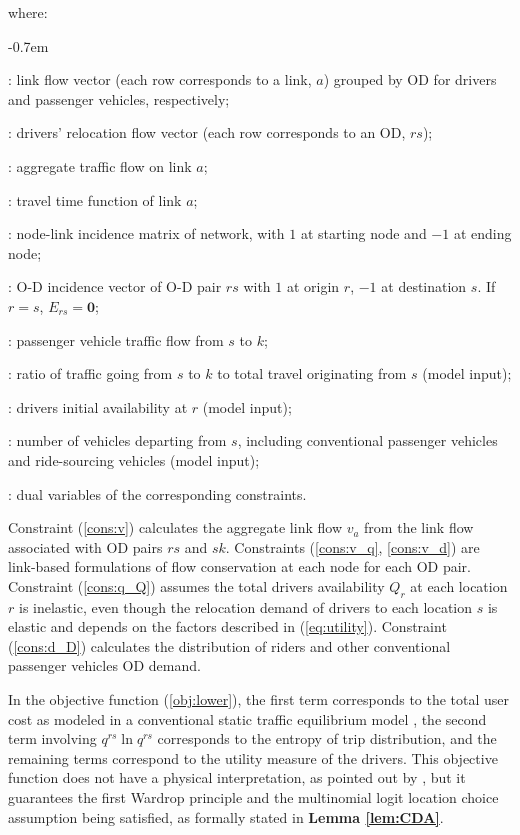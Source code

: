 \documentclass[review]{elsarticle}
\begin{document}
where: 
\begin{description}[leftmargin=!,labelwidth=\widthof{12345}]
\itemsep-0.7em
\item[$\bm{\hat{v}}_{rs}, \bm{\check{v}}_{sk}$] : link flow vector (each row corresponds to a link, $a$) grouped by OD for drivers and passenger vehicles, respectively;
\item[$\bm{q}$] : drivers' relocation flow vector (each row corresponds to an OD, $rs$);
\item[$v_a$] : aggregate traffic flow on link $a$; 
\item[$t_a(\cdot)$] : travel time function of link $a$; 
\item[$A$] : node-link incidence matrix of network, with $1$ at starting node and $-1$ at ending node;
\item[$E_{rs}$] : O-D incidence vector of O-D pair $rs$ with $1$ at origin $r$, $-1$ at destination $s$. If $r=s$, $E_{rs} = \bm{0}$;
\item[$\bar{d}_{sk}$] : passenger vehicle traffic flow from $s$ to $k$;
\item[$\delta_{sk}$] : ratio of traffic going from $s$ to $k$ to total travel originating from $s$ (model input); 
\item[$Q_{r}$] : drivers initial availability at $r$ (model input); 
\item[$\bar{D}_{s}$] : number of vehicles departing from $s$, including conventional passenger vehicles and ride-sourcing vehicles (model input); 
\item[$\check{\lambda}, \hat{\lambda}, \gamma, \eta$] : dual variables of the corresponding constraints. 
\end{description}

Constraint (\ref{cons:v}) calculates the aggregate link flow $v_a$ from the link flow associated with OD pairs $rs$ and $sk$. Constraints (\ref{cons:v_q}, \ref{cons:v_d}) are link-based formulations of flow conservation at each node for each OD pair. Constraint (\ref{cons:q_Q}) assumes the total drivers availability $Q_r$ at each location $r$ is inelastic, even though the relocation demand of drivers to each location $s$ is elastic and depends on the factors described in (\ref{eq:utility}). Constraint (\ref{cons:d_D}) calculates the distribution of riders and other conventional passenger vehicles OD demand.

In the objective function (\ref{obj:lower}), the first term corresponds to the total user cost as modeled in a conventional static traffic equilibrium model \citep{beckmann1956studies}, the second term involving $q^{rs}\ln q^{rs}$ corresponds to the entropy of trip distribution, and the remaining terms correspond to the utility measure of the drivers.  This objective function does not have a physical interpretation, as pointed out by \cite{Sheffi_85}, but it guarantees the first Wardrop principle \citep{Wardrop_52} and the multinomial logit location choice assumption being satisfied, as formally stated in {\bf Lemma \ref{lem:CDA}}.
\end{document}
